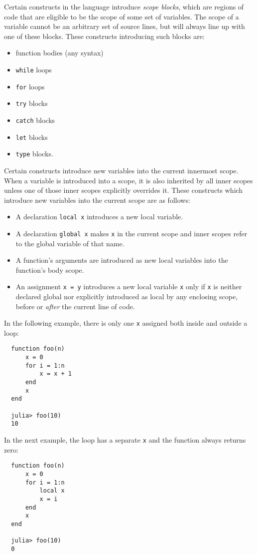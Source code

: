\documentclass{article}
\begin{document}
Certain constructs in the language introduce \emph{scope blocks}, which
are regions of code that are eligible to be the scope of some set of variables.
The scope of a variable cannot be an arbitrary set of
source lines, but will always line up with one of these blocks. These
constructs introducing such blocks are:
\begin{itemize}
\item function bodies (any syntax)
\item \verb|while| loops
\item \verb|for| loops
\item \verb|try| blocks
\item \verb|catch| blocks
\item \verb|let| blocks
\item \verb|type| blocks.
\end{itemize}
Certain constructs introduce new variables into the current innermost scope. When
a variable is introduced into a scope, it is also inherited by all inner
scopes unless one of those inner scopes explicitly overrides it. These
constructs which introduce new variables into the current scope are as follows:
\begin{itemize}
\item A declaration \verb|local x| introduces a new local variable.
\item A declaration \verb|global x| makes \verb|x| in the current scope
and inner scopes refer to the global variable of that name.
\item A function's arguments are introduced as new local variables into the
function's body scope.
\item An assignment \verb|x = y| introduces a new local variable \verb|x|
only if \verb|x| is neither declared global nor explicitly introduced as local
by any enclosing scope, before or \emph{after} the current line of code.
\end{itemize}
In the following example, there is only one \verb|x| assigned both inside
and outside a loop:
\begin{verbatim}
  function foo(n)
      x = 0
      for i = 1:n
          x = x + 1
      end
      x
  end
  
  julia> foo(10)
  10
\end{verbatim}
In the next example, the loop has a separate \verb|x| and the function
always returns zero:
\begin{verbatim}
  function foo(n)
      x = 0
      for i = 1:n
          local x
          x = i
      end
      x
  end

  julia> foo(10)
  0
\end{verbatim}
\end{document}

